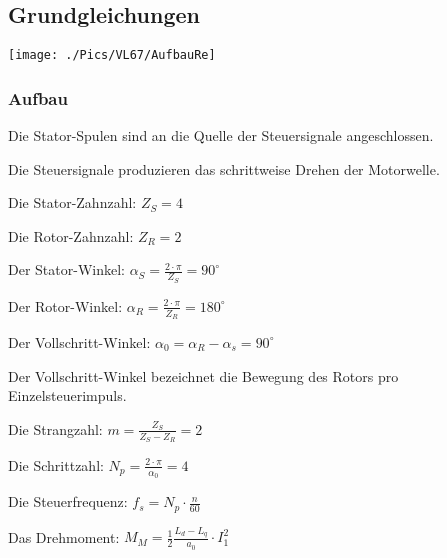 \subsection{Grundgleichungen}
\begin{minipage}{0.5 \linewidth}
\texttt{[image: ./Pics/VL67/AufbauRe]}
\end{minipage}
\begin{minipage}{0.5 \linewidth}
\subsubsection{Aufbau}
\begin{compactitem}
\item Die Stator-Spulen sind an die Quelle der Steuersignale angeschlossen.
\item Die Steuersignale produzieren das schrittweise Drehen der Motorwelle.
\item Die Stator-Zahnzahl: $Z_S = 4$
\item Die Rotor-Zahnzahl: $Z_R = 2$
\item Der Stator-Winkel: $\alpha_S = \frac{2\cdot \pi}{Z_S} = 90^\circ$
\item Der Rotor-Winkel: $\alpha_R =  \frac{2\cdot \pi}{Z_R} = 180^\circ$
\item Der Vollschritt-Winkel: $\alpha_0 = \alpha_R - \alpha_s = 90^\circ$ 
\item Der Vollschritt-Winkel bezeichnet die Bewegung des Rotors pro Einzelsteuerimpuls.
\item Die Strangzahl: $m = \frac{Z_S}{Z_S - Z_R} = 2$
\item Die Schrittzahl: $N_p = \frac{2\cdot \pi}{\alpha_0} = 4$
\item Die Steuerfrequenz: $f_s = N_p \cdot \frac{n}{60}$ 
\item Das Drehmoment: $M_M = \frac{1}{2} \frac{L_d-L_q}{a_0} \cdot I^2_1$
\end{compactitem}
\end{minipage}

